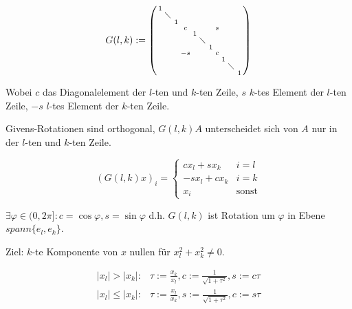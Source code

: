 $$G(l,k) := \left(\begin{smallmatrix}
1 &           &   &    &   &           &   &   &   &           &   \\
  & \diagdown &   &    &   &           &   &   &   &           &   \\
  &           & 1 &    &   &           &   &   &   &           &   \\
  &           &   &  c &   &           &   & s &   &           &   \\
  &           &   &    & 1 &           &   &   &   &           &   \\
  &           &   &    &   & \diagdown &   &   &   &           &   \\
  &           &   &    &   &           & 1 &   &   &           &   \\
  &           &   & -s &   &           &   & c &   &           &   \\
  &           &   &    &   &           &   &   & 1 &           &   \\
  &           &   &    &   &           &   &   &   & \diagdown &   \\
  &           &   &    &   &           &   &   &   &           & 1
\end{smallmatrix}\right)$$

Wobei $c$ das Diagonalelement der $l$-ten und $k$-ten Zeile, $s$ $k$-tes Element der $l$-ten Zeile, $-s$ $l$-tes Element der $k$-ten Zeile.

Givens-Rotationen sind orthogonal, $G(l,k)A$ unterscheidet sich von $A$ nur in der $l$-ten und $k$-ten Zeile.

\vspace{-4mm}
$$(G(l,k)x)_i = \begin{cases}
	cx_l  + sx_k & i=l \\
	-sx_l + cx_k & i=k \\
	x_i          & \text{sonst}
\end{cases}$$

$\exists \varphi \in (0,2\pi] : c=\cos{\varphi}, s=\sin{\varphi}$ d.h. $G(l,k)$ ist Rotation um $\varphi$ in Ebene $spann\{e_l,e_k\}$.

Ziel: $k$-te Komponente von $x$ nullen für $x_l^2+x_k^2 \neq 0$.

\vspace{-4mm}
\begin{align*}
	|x_l| > |x_k| : &\tau := \frac{x_k}{x_l}, c := \frac{1}{\sqrt{1+\tau^2}}, s := c\tau \\
	|x_l| \leq |x_k| : &\tau := \frac{x_l}{x_k}, s := \frac{1}{\sqrt{1+\tau^2}}, c := s\tau
\end{align*}

